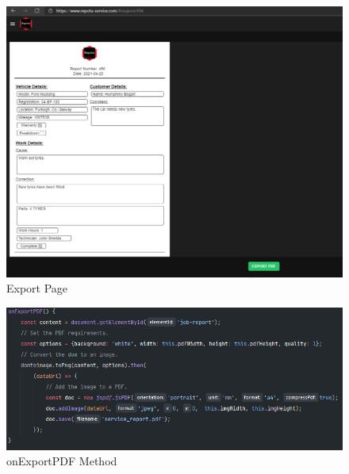 \begin{figure}[H]
    \centering
    \caption{Export Page}
    \label{image:export}
    \includegraphics[width=1.0\textwidth]{images/repota/UI/export-page.png}
\end{figure}

\begin{figure}[H]
    \centering
    \caption{onExportPDF Method}
    \label{image:onExportPDF}
    \includegraphics[width=1.0\textwidth]{images/repota/report_pages/export.png}
\end{figure}

